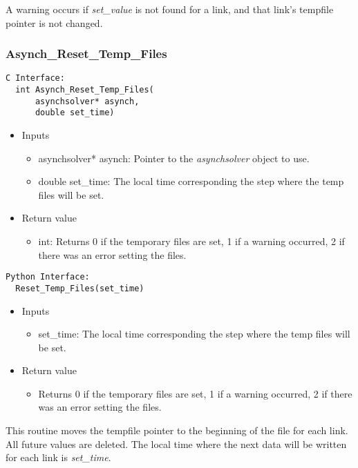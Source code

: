 \documentclass[12pt]{article}
\begin{document}
A warning occurs if \emph{set\_value} is not found for a link, and that link's tempfile pointer is not changed.



\subsubsection{Asynch\_Reset\_Temp\_Files} \label{sec: asynch_reset_temp_files}

\begin{lstlisting}[style=CStyle]
  C Interface:
  int Asynch_Reset_Temp_Files(
      asynchsolver* asynch,
      double set_time)
\end{lstlisting}
\begin{itemize}
 \item Inputs
  \begin{itemize}
   \item asynchsolver* asynch: Pointer to the \emph{asynchsolver} object to use.
   \item double set\_time: The local time corresponding the step where the temp files will be set.
  \end{itemize}
 \item Return value
  \begin{itemize}
   \item int: Returns 0 if the temporary files are set, 1 if a warning occurred, 2 if there was an error setting the files.
  \end{itemize}
\end{itemize}
\begin{lstlisting}[style=PythonStyle]
  Python Interface:
  Reset_Temp_Files(set_time)
\end{lstlisting}
\begin{itemize}
 \item Inputs
  \begin{itemize}
   \item set\_time: The local time corresponding the step where the temp files will be set.
  \end{itemize}
 \item Return value
  \begin{itemize}
   \item Returns 0 if the temporary files are set, 1 if a warning occurred, 2 if there was an error setting the files.
  \end{itemize}
\end{itemize}
This routine moves the tempfile pointer to the beginning of the file for each link. All future values are deleted. The local time where the next data will be written for each link is \emph{set\_time}.
\end{document}
